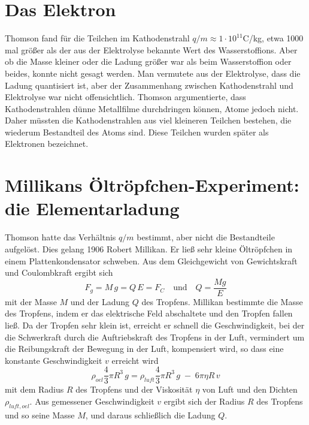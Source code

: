\section{Das Elektron}

Thomson fand für die Teilchen im Kathodenstrahl $q/m \approx 1 \cdot 10^{11}$C/kg, etwa 1000 mal größer als der aus der Elektrolyse bekannte Wert des Wasserstoffions. Aber ob die Masse kleiner oder die Ladung größer war als beim Wasserstoffion oder beides, konnte nicht gesagt werden. Man vermutete aus der Elektrolyse, dass die Ladung quantisiert ist, aber der Zusammenhang zwischen Kathodenstrahl und Elektrolyse war nicht offensichtlich. Thomson argumentierte, dass Kathodenstrahlen dünne Metallfilme durchdringen können, Atome jedoch nicht. Daher müssten die Kathodenstrahlen aus viel kleineren Teilchen bestehen, die wiederum Bestandteil des Atoms sind. Diese Teilchen wurden später als Elektronen bezeichnet.

\section{Millikans Öltröpfchen-Experiment: die Elementarladung}

Thomson hatte das Verhältnis $q/m$ bestimmt, aber nicht die Bestandteile aufgelöst. Dies gelang 1906 Robert Millikan. Er ließ sehr kleine Öltröpfchen in einem Plattenkondensator schweben. Aus dem Gleichgewicht von Gewichtskraft und Coulombkraft ergibt sich 
\begin{equation}
    F_g = M \, g = Q \, E = F_C \quad \text{und} \quad Q = \frac{M g}{E}
\end{equation}
mit der Masse $M$ und der Ladung $Q$ des Tropfens. Millikan bestimmte die Masse des Tropfens, indem er das elektrische Feld abschaltete und den Tropfen fallen ließ. Da der Tropfen sehr klein ist, erreicht er schnell die Geschwindigkeit, bei der die Schwerkraft durch die Auftriebskraft des Tropfens in der Luft, vermindert um die Reibungskraft der Bewegung in der Luft, kompensiert wird, so dass eine konstante Geschwindigkeit $v$ erreicht wird
\begin{equation}
    \rho_{oel} \frac{4}{3} \pi R^3 \, g  =  \rho_{luft} \frac{4}{3} \pi R^3 \, g
     \; - \; 6 
     \pi \eta R \, v 
 \end{equation}
mit dem Radius $R$ des Tropfens und der Viskosität $\eta$ von Luft und den Dichten $\rho_{luft, oel}$. Aus gemessener Geschwindigkeit $v$ ergibt sich  der Radius  $R$ des Tropfens und so seine Masse $M$, und daraus schließlich die Ladung $Q$.

